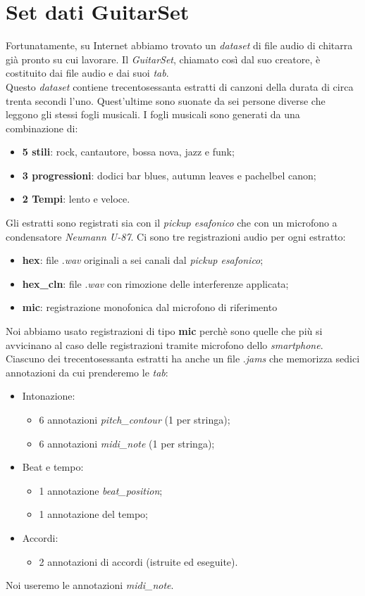 \section{Set dati GuitarSet}
Fortunatamente, su Internet abbiamo trovato un \textit{dataset} di file audio di chitarra già pronto su cui lavorare. Il \textit{GuitarSet}, chiamato così dal suo creatore, è costituito dai file audio e dai suoi \textit{tab}.\\
\newline
Questo \textit{dataset} contiene trecentosessanta estratti di canzoni della durata di circa trenta secondi l'uno. Quest'ultime sono suonate da sei persone diverse che leggono gli stessi fogli musicali. I fogli musicali sono generati da una combinazione di:
\begin{itemize}
	\item \textbf{5 stili}: rock, cantautore, bossa nova, jazz e funk;
	\item \textbf{3 progressioni}: dodici bar blues, autumn leaves e pachelbel canon;
	\item \textbf{2 Tempi}: lento e veloce.
\end{itemize}
Gli estratti sono registrati sia con il \textit{pickup esafonico} che con un microfono a condensatore \textit{Neumann U-87}.
Ci sono tre registrazioni audio per ogni estratto:
\begin{itemize}
	\item \textbf{hex}: file .\textit{wav} originali a sei canali dal \textit{pickup esafonico};
	\item \textbf{hex\_cln}: file .\textit{wav} con rimozione delle interferenze applicata;
	\item \textbf{mic}: registrazione monofonica dal microfono di riferimento
\end{itemize}
Noi abbiamo usato registrazioni di tipo \textbf{mic} perchè sono quelle che più si avvicinano al caso delle registrazioni tramite microfono dello \textit{smartphone}.\\
\newline
Ciascuno dei trecentosessanta estratti ha anche un file .\textit{jams} che memorizza sedici annotazioni da cui prenderemo le \textit{tab}:
\begin{itemize}
	\item Intonazione:
	\begin{itemize}
		\item 6 annotazioni \textit{pitch\_contour} (1 per stringa);
		\item 6 annotazioni \textit{midi\_note} (1 per stringa);
	\end{itemize}
	\item Beat e tempo:
	\begin{itemize}
		\item 1 annotazione \textit{beat\_position};
		\item 1 annotazione del tempo;
	\end{itemize}
	\item Accordi:
	\begin{itemize}
		\item 2 annotazioni di accordi (istruite ed eseguite).
	\end{itemize}
\end{itemize}
Noi useremo le annotazioni \textit{midi\_note}.

